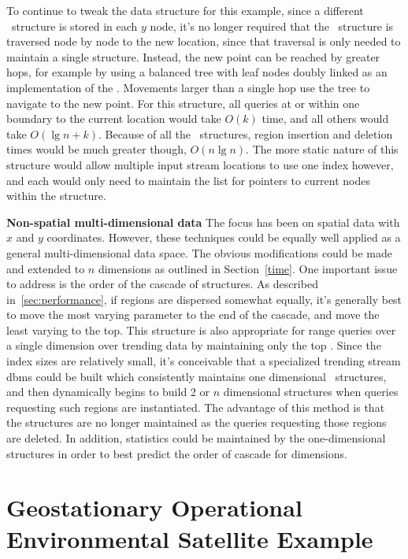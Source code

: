 \documentclass{sig-alternate}
\newcommand{\List}{\id{List}}
\newcommand{\YList}{\id{2-Key-List}}
\newcommand{\inC}[1]{{\id{DCT_{#1}}}}
\newcommand{\X}{{\inC{X}}}
\newcommand{\Y}{{\inC{Y}}}
\begin{document}
To continue to tweak the data structure for this example, since a
different \X\ structure is stored in each $y$ node, it's no longer
required that the \Y\ structure is traversed node by node to the new
location, since that traversal is only needed to maintain a single \X
structure.  Instead, the new point can be reached by greater hops, for
example by using a balanced tree with leaf nodes doubly linked as an
implementation of the \YList.  Movements larger than a single hop use
the tree to navigate to the new point.  For this structure, all
queries at or within one boundary to the current location would take
$O(k)$ time, and all others would take $O(\lg{n}+k)$.  Because of all
the \X\ structures, region insertion and deletion times would be much
greater though, $O(n\lg{n})$.  The more static nature of this structure
would allow multiple input stream locations to use one index however,
and each would only need to maintain the list for pointers to current
nodes within the structure.

{\bf Non-spatial multi-dimensional data}
%
The focus has been on spatial data with $x$ and $y$ coordinates.
However, these techniques could be equally well applied as a general
multi-dimensional data space.  The obvious modifications could be made
and extended to $n$ dimensions as outlined in Section~\ref{time}.  One
important issue to address is the order of the cascade of \List
structures.  As described in~\ref{sec:performance}, if regions are
dispersed somewhat equally, it's generally best to move the most
varying parameter to the end of the cascade, and move the least
varying to the top.  This structure is also appropriate for range
queries over a single dimension over trending data by maintaining only
the top \YList.  Since the index sizes are relatively small, it's
conceivable that a specialized trending stream \ac{dbms} could be built
which consistently maintains one dimensional \ structures, and
then dynamically begins to build 2 or $n$ dimensional structures when
queries requesting such regions are instantiated.  The advantage of
this method is that the structures are no longer maintained as the
queries requesting those regions are deleted.  In addition, statistics
could be maintained by the one-dimensional structures in order to best
predict the order of cascade for dimensions.

\section{Geostationary Operational Environmental Satellite Example}
\label{sec:goes}
\end{document}
